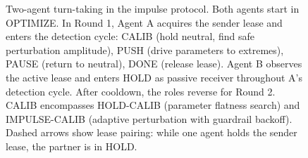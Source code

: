 \begin{figure}[t]
\caption{Two-agent turn-taking in the impulse protocol. Both agents
start in OPTIMIZE. In Round 1, Agent A acquires the sender lease and
enters the detection cycle: CALIB (hold neutral, find safe perturbation
amplitude), PUSH (drive parameters to extremes), PAUSE (return to
neutral), DONE (release lease). Agent B observes the active lease
and enters HOLD as passive receiver throughout A's detection cycle.
After cooldown, the roles reverse for Round 2. CALIB encompasses
HOLD-CALIB (parameter flatness search) and IMPULSE-CALIB (adaptive
perturbation with guardrail backoff). Dashed arrows show lease
pairing: while one agent holds the sender lease, the partner is in
HOLD.}
\label{fig:state-machine}
\end{figure}
